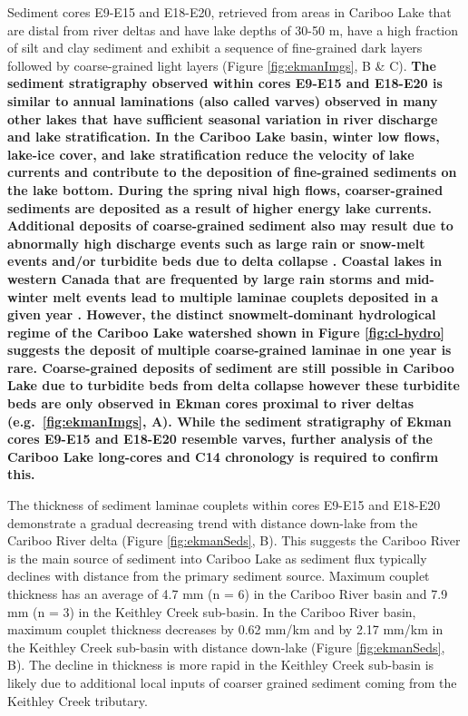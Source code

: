 \documentclass[Royal,times,doublespace,sageh]{sagej}
\begin{document}
Sediment cores E9-E15 and E18-E20, retrieved from areas in Cariboo Lake
that are distal from river deltas and have lake depths of 30-50 m, have
a high fraction of silt and clay sediment and exhibit a sequence of
fine-grained dark layers followed by coarse-grained light layers (Figure
\ref{fig:ekmanImgs}, B \& C). \textbf{The sediment stratigraphy observed
within cores E9-E15 and E18-E20 is similar to annual laminations (also
called varves) observed in many other lakes
\citep{Cockburn2008, Zolitschka2015a, Heideman2015, Hodder2006b, Desloges1999}
that have sufficient seasonal variation in river discharge and lake
stratification. In the Cariboo Lake basin, winter low flows, lake-ice
cover, and lake stratification reduce the velocity of lake currents and
contribute to the deposition of fine-grained sediments on the lake
bottom. During the spring nival high flows, coarser-grained sediments
are deposited as a result of higher energy lake currents. Additional
deposits of coarse-grained sediment also may result due to abnormally
high discharge events such as large rain or snow-melt events and/or
turbidite beds due to delta collapse \citep{sabatier2022}. Coastal lakes
in western Canada that are frequented by large rain storms and
mid-winter melt events lead to multiple laminae couplets deposited in a
given year \citep{Menounos2008c}. However, the distinct
snowmelt-dominant hydrological regime of the Cariboo Lake watershed
shown in Figure \ref{fig:cl-hydro} suggests the deposit of multiple
coarse-grained laminae in one year is rare. Coarse-grained deposits of
sediment are still possible in Cariboo Lake due to turbidite beds from
delta collapse however these turbidite beds are only observed in Ekman
cores proximal to river deltas (e.g.~\ref{fig:ekmanImgs}, A). While the
sediment stratigraphy of Ekman cores E9-E15 and E18-E20 resemble varves,
further analysis of the Cariboo Lake long-cores and C14 chronology is
required to confirm this.}

The thickness of sediment laminae couplets within cores E9-E15 and
E18-E20 demonstrate a gradual decreasing trend with distance down-lake
from the Cariboo River delta (Figure \ref{fig:ekmanSeds}, B). This
suggests the Cariboo River is the main source of sediment into Cariboo
Lake as sediment flux typically declines with distance from the primary
sediment source. Maximum couplet thickness has an average of 4.7 mm (n =
6) in the Cariboo River basin and 7.9 mm (n = 3) in the Keithley Creek
sub-basin. In the Cariboo River basin, maximum couplet thickness
decreases by 0.62 mm/km and by 2.17 mm/km in the Keithley Creek
sub-basin with distance down-lake (Figure \ref{fig:ekmanSeds}, B). The
decline in thickness is more rapid in the Keithley Creek sub-basin is
likely due to additional local inputs of coarser grained sediment coming
from the Keithley Creek tributary.
\end{document}
